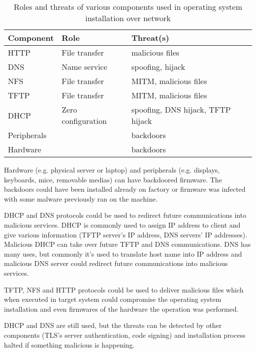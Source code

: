 \begin{table}[!ht]
  \def\arraystretch{1.1}%
  \begin{center}
    \label{tab:threats_table}
    \begin{tabular}{| l | l | l |}
      \hline
      Component   & Role               & Threat(s) \\
      \hline
      HTTP        & File transfer      & malicious files \\
      DNS         & Name service       & spoofing, hijack \\
      NFS         & File transfer      & MITM, malicious files \\
      TFTP        & File transfer      & MITM, malicious files \\
      DHCP        & Zero configuration & spoofing, DNS hijack, TFTP hijack \\
      Peripherals & & backdoors \\
      Hardware    & & backdoors \\
      \hline
    \end{tabular}
    \caption{Roles and threats of various components used in operating
      system installation over network}
  \end{center}
\end{table}

Hardware (e.g.  physical server or laptop) and peripherals
(e.g. displays, keyboards, mice, removable medias) can have backdoored
firmware. The backdoors could have been installed already on factory
or firmware was infected with some malware previously ran on the
machine.

DHCP and DNS protocols could be used to redirect future communications
into malicious services. DHCP is commonly used to assign IP address to
client and give various information (TFTP server's IP address, DNS
servers' IP addresses). Malicious DHCP can take over future TFTP and
DNS communications. DNS has many uses, but commonly it's used to
translate host name into IP address and malicious DNS server could
redirect future communications into malicious services.

TFTP, NFS and HTTP protocols could be used to deliver malicious files
which when executed in target system could compromise the operating
system installation and even firmwares of the hardware the operation
was performed.

DHCP and DNS are still used, but the threats can be detected by other
components (TLS's server authentication, code signing) and
installation process halted if something malicious is happening.
